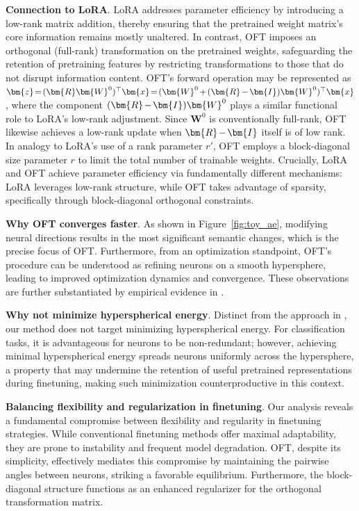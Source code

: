 \textbf{Connection to LoRA}. LoRA addresses parameter efficiency by introducing a low-rank matrix addition, thereby ensuring that the pretrained weight matrix's core information remains mostly unaltered. In contrast, OFT imposes an orthogonal (full-rank) transformation on the pretrained weights, safeguarding the retention of pretraining features by restricting transformations to those that do not disrupt information content. OFT’s forward operation may be represented as $\thickmuskip=2mu \medmuskip=2mu \bm{z}=(\bm{R}\bm{W}^0)^\top\bm{x}=(\bm{W}^0+(\bm{R}-\bm{I})\bm{W}^0)^\top\bm{x}$, where the component $\thickmuskip=2mu \medmuskip=2mu (\bm{R}-\bm{I})\bm{W}^0$ plays a similar functional role to LoRA’s low-rank adjustment. Since $\bm{W}^0$ is conventionally full-rank, OFT likewise achieves a low-rank update when $\thickmuskip=2mu \medmuskip=2mu \bm{R}-\bm{I}$ itself is of low rank. In analogy to LoRA’s use of a rank parameter $r'$, OFT employs a block-diagonal size parameter $r$ to limit the total number of trainable weights. Crucially, LoRA and OFT achieve parameter efficiency via fundamentally different mechanisms: LoRA leverages low-rank structure, while OFT takes advantage of sparsity, specifically through block-diagonal orthogonal constraints.

\textbf{Why OFT converges faster}. As shown in Figure~\ref{fig:toy_ae}, modifying neural directions results in the most significant semantic changes, which is the precise focus of OFT. Furthermore, from an optimization standpoint, OFT’s procedure can be understood as refining neurons on a smooth hypersphere, leading to improved optimization dynamics and convergence. These observations are further substantiated by empirical evidence in \cite{liu2021orthogonal}.

\textbf{Why not minimize hyperspherical energy}. Distinct from the approach in \cite{liu2021orthogonal}, our method does not target minimizing hyperspherical energy. For classification tasks, it is advantageous for neurons to be non-redundant; however, achieving minimal hyperspherical energy spreads neurons uniformly across the hypersphere, a property that may undermine the retention of useful pretrained representations during finetuning, making such minimization counterproductive in this context.

\textbf{Balancing flexibility and regularization in finetuning}. Our analysis reveals a fundamental compromise between flexibility and regularity in finetuning strategies. While conventional finetuning methods offer maximal adaptability, they are prone to instability and frequent model degradation. OFT, despite its simplicity, effectively mediates this compromise by maintaining the pairwise angles between neurons, striking a favorable equilibrium. Furthermore, the block-diagonal structure functions as an enhanced regularizer for the orthogonal transformation matrix.

